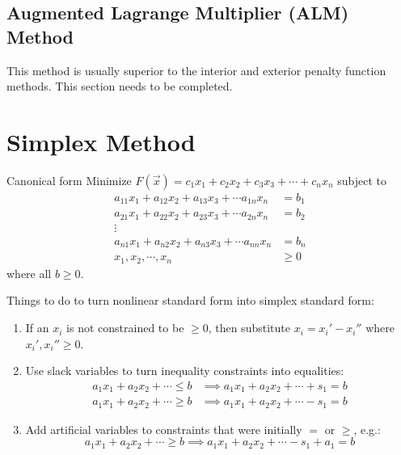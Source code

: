 \documentclass{article}
\begin{document}
\subsection{Augmented Lagrange Multiplier (ALM) Method}

This method is usually superior to the interior and exterior penalty function
methods. This section needs to be completed.

\section{Simplex Method}

\begin{description*}
\item[Canonical form]
  Minimize \(F(\vec{x}) = c_1x_1 + c_2x_2 + c_3x_3 + \cdots + c_nx_n\) subject to
  \begin{align*}
    a_{11}x_1 + a_{12}x_2 + a_{13}x_3 + \cdots a_{1n}x_n &= b_1 \\
    a_{21}x_1 + a_{22}x_2 + a_{23}x_3 + \cdots a_{2n}x_n &= b_2 \\
    \vdots \\
    a_{n1}x_1 + a_{n2}x_2 + a_{n3}x_3 + \cdots a_{nn}x_n &= b_n \\
    x_1,x_2,\cdots,x_n &\ge 0
  \end{align*}
  where all \(b \ge 0\).
\end{description*}

Things to do to turn nonlinear standard form into simplex standard form:
\begin{enumerate}
\item If an \(x_i\) is not constrained to be \(\ge 0\), then substitute \(x_i = x_i' - x_i''\) where \(x_i',x_i'' \ge 0\).
\item Use slack variables to turn inequality constraints into equalities:
  \begin{align*}
    a_1x_1 + a_2x_2 + \cdots \le b &\implies a_1x_1 + a_2x_2 + \cdots + s_1 = b \\
    a_1x_1 + a_2x_2 + \cdots \ge b &\implies a_1x_1 + a_2x_2 + \cdots - s_1 = b
  \end{align*}
\item Add artificial variables to constraints that were initially \(=\) or \(\ge\), e.g.:
  \[a_1x_1 + a_2x_2 + \cdots \ge b \implies a_1x_1 + a_2x_2 + \cdots - s_1 + a_1 = b\]
\end{enumerate}
\end{document}
